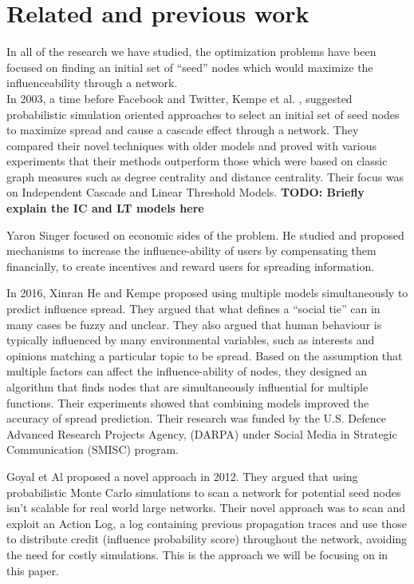 \documentclass{acm_proc_article-sp}
\begin{document}
\section{Related and previous work}

In all of the research we have studied, the optimization problems have been focused on finding an initial set of “seed” nodes which would maximize the influenceability through a network. \\

In 2003, a time before Facebook and Twitter, Kempe et al. \cite{kempe:maxspread}, suggested probabilistic simulation oriented approaches to select an initial set of seed nodes to maximize spread and cause a cascade effect through a network. They compared their novel techniques with older models and proved with various experiments that their methods outperform those which were based on classic graph measures such as degree centrality and distance centrality. Their focus was on Independent Cascade and Linear Threshold Models.
\textbf{TODO: Briefly explain the IC and LT models here}

Yaron Singer \cite{singer:winfriends} focused on economic sides of the problem. He studied and proposed mechanisms to increase the influence-ability of users by compensating them financially, to create incentives and reward users for spreading information.

In 2016, Xinran He and Kempe \cite{DBLP:journals/corr/HeK16} proposed using multiple models simultaneously to predict influence spread. They argued that what defines a “social tie” can in many cases be fuzzy and unclear. They also argued that human behaviour is typically influenced by many environmental variables, such as interests and opinions matching a particular topic to be spread. Based on the assumption that multiple factors can affect the influence-ability of nodes, they designed an algorithm that finds nodes that are simultaneously influential for multiple functions. Their experiments showed that combining models improved the accuracy of spread prediction. Their research was funded by the U.S. Defence Advanced Research Projects Agency, (DARPA) under Social Media in Strategic Communication (SMISC) program.


Goyal et Al \cite{goyal:datainfluence} proposed a novel approach in 2012. They argued that using probabilistic Monte Carlo simulations to scan a network for potential seed nodes isn't scalable for real world large networks. Their novel approach was to scan and exploit an Action Log, a log containing previous propagation traces and use those to distribute credit (influence probability score) throughout the network, avoiding the need for costly simulations. This is the approach we will be focusing on in this paper.
\end{document}
